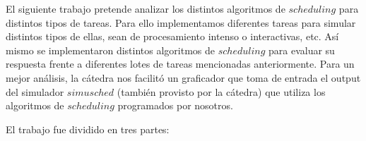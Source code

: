 El siguiente trabajo pretende analizar los distintos algoritmos de $scheduling$ para distintos tipos de tareas. 
Para ello implementamos diferentes tareas para simular distintos tipos de ellas, sean de procesamiento intenso o interactivas, etc.
Así mismo se implementaron distintos algoritmos de $scheduling$ para evaluar su respuesta frente a diferentes lotes de tareas mencionadas anteriormente.
Para un mejor análisis, la cátedra nos facilitó un graficador que toma de entrada el output del simulador $simusched$ (también provisto por la cátedra) que utiliza los algoritmos de $scheduling$ programados por nosotros.

El trabajo fue dividido en tres partes:
